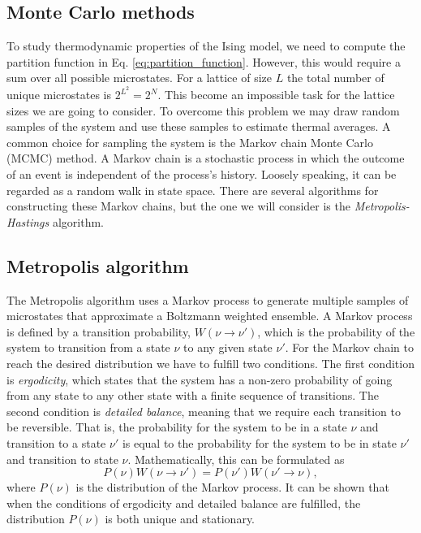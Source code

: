 \subsection{Monte Carlo methods} \label{subsec_theory:MC_methods}

To study thermodynamic properties of the Ising model, we need to compute the partition function in Eq. \eqref{eq:partition_function}. However, this would require a sum over all possible microstates. For a lattice of size $L$ the total number of unique microstates is $2^{L^2}=2^N$. This become an impossible task for the lattice sizes we are going to consider. To overcome this problem we may draw random samples of the system and use these samples to estimate thermal averages. A common choice for sampling the system is the Markov chain Monte Carlo (MCMC) method. A Markov chain is a stochastic process in which the outcome of an event is independent of the process's history. Loosely speaking, it can be regarded as a random walk in state space. There are several algorithms for constructing these Markov chains, but the one we will consider is the \textit{Metropolis-Hastings} algorithm.

\subsection{Metropolis algorithm} \label{subsec_theory:metropolis_algorithm}
The Metropolis algorithm uses a Markov process to generate multiple samples of microstates that approximate a Boltzmann weighted ensemble. A Markov process is defined by a transition probability, $W(\nu \to \nu')$, which is the probability of the system to transition from a state $\nu$ to any given state $\nu'$. For the Markov chain to reach the desired distribution we have to fulfill two conditions.  The first condition is \textit{ergodicity}, which states that the system has a non-zero probability of going from any state to any other state with a finite sequence of transitions. The second condition is \textit{detailed balance}, meaning that we require each transition to be reversible. That is, the probability for the system to be in a state $\nu$ and transition to a state $\nu'$ is equal to the probability for the system to be in state $\nu'$ and transition to state $\nu$. Mathematically, this can be formulated as 
\begin{equation}
    P(\nu)W(\nu\to \nu') = P(\nu') W(\nu'\to \nu), \label{eq:detailed_balance}
\end{equation} 
where $P(\nu)$ is the distribution of the Markov process. It can be shown that when the conditions of ergodicity and detailed balance are fulfilled, the distribution $P(\nu)$ is both unique and stationary. 

